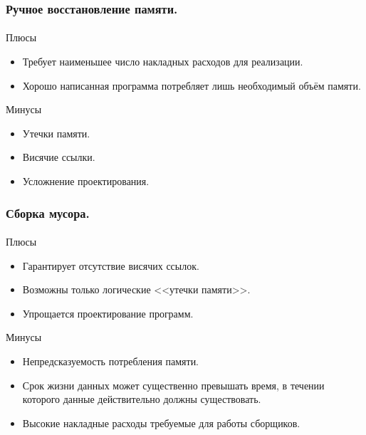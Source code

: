 \documentclass[ucs]{beamer}
\begin{document}
\begin{frame}[fragile]
  \frametitle{Ручное восстановление памяти.}
  \framesubtitle{}
  \begin{block}{Плюсы}
    \begin{itemize}
    \item Требует наименьшее число накладных расходов для реализации.
    \item Хорошо написанная программа потребляет лишь необходимый объём памяти.
    \end{itemize}
  \end{block}

  \begin{block}{Минусы}
    \begin{itemize}
    \item Утечки памяти.
    \item Висячие ссылки.
    \item Усложнение проектирования.
    \end{itemize}
  \end{block}
\end{frame}

\begin{frame}[fragile]
  \frametitle{Сборка мусора.}
  \framesubtitle{}
  \begin{block}{Плюсы}
    \begin{itemize}
    \item Гарантирует отсутствие висячих ссылок.
    \item Возможны только логические <<утечки памяти>>.
    \item Упрощается проектирование программ.
    \end{itemize}
  \end{block}

  \begin{block}{Минусы}
    \begin{itemize}
    \item Непредсказуемость потребления памяти.
    \item Срок жизни данных может существенно превышать время, в течении
      которого данные действительно должны существовать.
    \item Высокие накладные расходы требуемые для работы сборщиков.
    \end{itemize}
  \end{block}
\end{frame}

\end{document}
